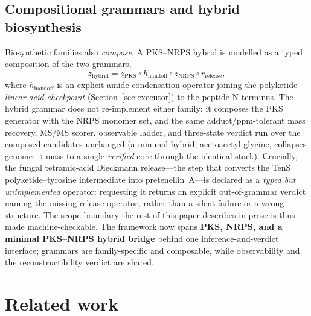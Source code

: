 \documentclass[11pt]{article}
\theoremstyle{definition}
\begin{document}
\subsection{Compositional grammars and hybrid biosynthesis}
\label{sec:hybrid}
Biosynthetic families also \emph{compose}. A PKS--NRPS hybrid is modelled as a typed composition of
the two grammars,
\begin{equation}
z_{\text{hybrid}} = z_{\text{PKS}} \circ h_{\text{handoff}} \circ z_{\text{NRPS}} \circ r_{\text{release}},
\end{equation}
where $h_{\text{handoff}}$ is an explicit amide-condensation operator joining the polyketide
\emph{linear-acid checkpoint} (Section~\ref{sec:executor}) to the peptide N-terminus. The hybrid
grammar does not re-implement either family: it composes the PKS generator with the NRPS monomer
set, and the same adduct/ppm-tolerant mass recovery, MS/MS scorer, observable ladder, and three-state
verdict run over the composed candidates unchanged (a minimal hybrid, acetoacetyl-glycine, collapses
genome$\to$mass to a single \emph{verified} core through the identical stack). Crucially, the
fungal tetramic-acid Dieckmann release---the step that converts the TenS polyketide--tyrosine
intermediate into pretenellin~A---is declared as a \emph{typed but unimplemented} operator: requesting
it returns an explicit out-of-grammar verdict naming the missing release operator, rather than a
silent failure or a wrong structure. The scope boundary the rest of this paper describes in prose is
thus made machine-checkable. The framework now spans \textbf{PKS, NRPS, and a minimal PKS--NRPS
hybrid bridge} behind one inference-and-verdict interface; grammars are family-specific and
composable, while observability and the reconstructibility verdict are shared.







\section{Related work}
\label{sec:related}
\end{document}
